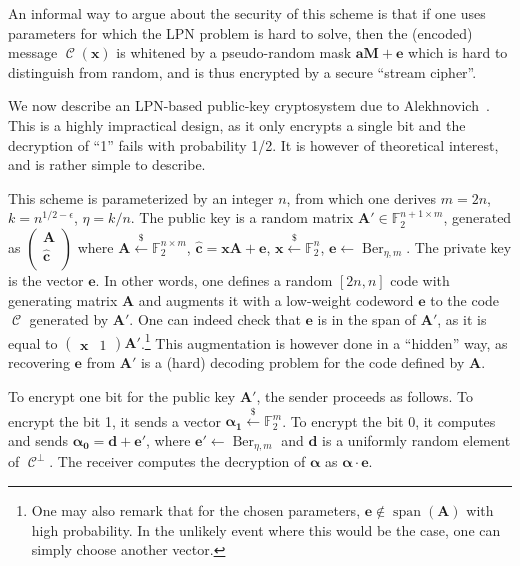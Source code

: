 \documentclass[11pt,a4paper]{article}
\theoremstyle{definition}
\DeclareMathOperator\code{\mathcal{C}}
\DeclareMathOperator\Ber{Ber}
\DeclareMathOperator\vspan{span}
\newcommand\ftwo{\mathbb{F}_{2}}
\newcommand\randraw{\xleftarrow{{\scriptscriptstyle\$}}}
\begin{document}
An informal way to argue about the security of this scheme is that if one uses parameters for which the LPN problem is hard to solve, then the (encoded) message $\code(\bm{x})$ is whitened
by a pseudo-random mask $\bm{a}\bm{M} + \bm{e}$ which is hard to distinguish from random, and is thus encrypted by a secure ``stream cipher''.

\medskip

We now describe an LPN-based public-key cryptosystem due to Alekhnovich~\cite{alekh03}. This is a highly impractical design, as it only encrypts a single bit and the decryption of ``1'' fails with
probability 1/2. It is however of theoretical interest, and is rather simple to describe.

This scheme is parameterized by an integer $n$, from which one derives $m = 2n$, $k = n^{1/2-\epsilon}$, $\eta = k/n$. The public key is a random matrix $\bm{A}' \in \ftwo^{n+1\times m}$, generated
as $\begin{pmatrix}\bm{A}\\ \bm{\hat{c}}\\ \end{pmatrix}$ where $\bm{A} \randraw \ftwo^{n\times m}$,  $\bm{\hat{c}} = \bm{x}\bm{A} + \bm{e}$,   $\bm{x} \randraw \ftwo^n$, $\bm{e} \leftarrow \Ber_{\eta,m}$.
The private key is the vector $\bm{e}$.
In other words, one defines a random $[2n,n]$ code with generating matrix $\bm{A}$ and augments it with a low-weight codeword $\bm{e}$ to the code $\code$ generated by $\bm{A}'$. One can indeed check
that $\bm{e}$ is in the span of $\bm{A}'$, as it is equal to $\begin{pmatrix} \bm{x} & 1 \end{pmatrix}\bm{A}'$.\footnote{One may also remark that for the chosen parameters, $\bm{e} \notin \vspan(\bm{A})$
with high probability. In the unlikely event where this would be the case, one can simply choose another vector.}
This augmentation is however done in a ``hidden'' way, as recovering $\bm{e}$
from $\bm{A}'$ is a (hard) decoding problem for the code defined by $\bm{A}$.

To encrypt one bit for the public key $\bm{A}'$, the sender proceeds as follows. To encrypt the bit 1, it sends a vector $\bm{\alpha_1} \randraw \ftwo^m$. To encrypt the bit 0,
it computes and sends $\bm{\alpha_0} = \bm{d} + \bm{e}'$, where $\bm{e}' \leftarrow \Ber_{\eta,m}$ and $\bm{d}$ is a uniformly random element of $\code^\bot$.
The receiver computes the decryption of $\bm{\alpha}$ as $\bm{\alpha} \cdot \bm{e}$.
\end{document}

